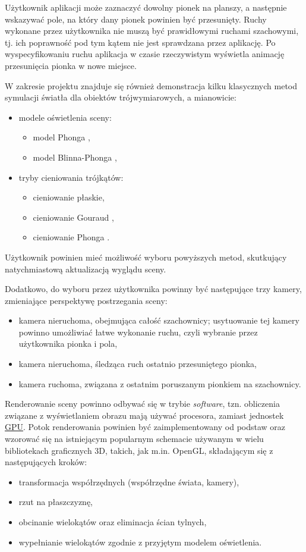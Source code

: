 \documentclass[10pt,a4paper]{article}
\begin{document}
Użytkownik aplikacji może zaznaczyć dowolny pionek na planszy, a następnie wskazywać pole, na który dany pionek powinien być przesunięty. Ruchy wykonane przez użytkownika nie muszą być prawidłowymi ruchami szachowymi, tj. ich poprawność pod tym kątem nie jest sprawdzana przez aplikację. Po wyspecyfikowaniu ruchu aplikacja w czasie rzeczywistym wyświetla animację przesunięcia pionka w nowe miejsce.

W zakresie projektu znajduje się również demonstracja kilku klasycznych metod symulacji światła dla obiektów trójwymiarowych, a mianowicie:
\begin{itemize}
	\item modele oświetlenia sceny:
	\begin{itemize}
		\item model Phonga \cite{phong75},
		\item model Blinna-Phonga \cite{blinn77},
	\end{itemize}
	\item tryby cieniowania trójkątów:
	\begin{itemize}
		\item cieniowanie płaskie,
		\item cieniowanie Gouraud \cite{gouraud71},
		\item cieniowanie Phonga \cite{phong75}.
	\end{itemize}
\end{itemize}
Użytkownik powinien mieć możliwość wyboru powyższych metod, skutkujący natychmiastową aktualizacją wyglądu sceny.

Dodatkowo, do wyboru przez użytkownika powinny być następujące trzy kamery, zmieniające perspektywę postrzegania sceny:
\begin{itemize}
	\item kamera nieruchoma, obejmująca całość szachownicy; usytuowanie tej kamery powinno umożliwiać łatwe wykonanie ruchu, czyli wybranie przez użytkownika pionka i pola,
	\item kamera nieruchoma, śledząca ruch ostatnio przesuniętego pionka,
	\item kamera ruchoma, związana z ostatnim poruszanym pionkiem na szachownicy.
\end{itemize}

Renderowanie sceny powinno odbywać się w trybie \emph{software}, tzn. obliczenia związane z wyświetlaniem obrazu mają używać procesora, zamiast jednostek \hyperref[abbr:gpu]{GPU}. Potok renderowania powinien być zaimplementowany od podstaw oraz wzorować się na istniejącym popularnym schemacie używanym w wielu bibliotekach graficznych 3D, takich, jak m.in. OpenGL, składającym się z następujących kroków:
\begin{itemize}
	\item transformacja współrzędnych (współrzędne świata, kamery),
	\item rzut na płaszczyznę,
	\item obcinanie wielokątów oraz eliminacja ścian tylnych,
	\item wypełnianie wielokątów zgodnie z przyjętym modelem oświetlenia.
\end{itemize}
\end{document}
